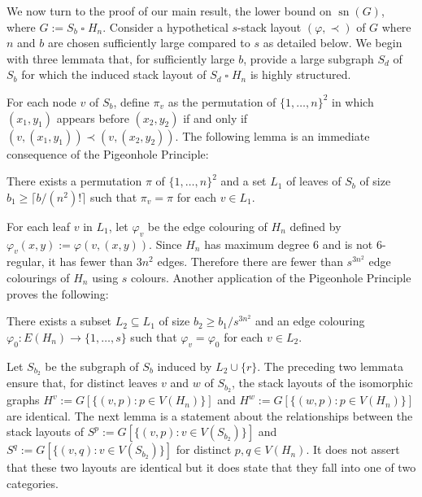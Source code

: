 \documentclass[kpfonts]{patmorin}
\DeclareMathOperator{\sn}{sn}
\renewcommand{\ge}{\geqslant}
\newcommand{\CartProd}{\mathbin{\square}}
\begin{document}
We now turn to the proof of our main result, the lower bound on $\sn(G)$, where $G:= S_b\CartProd H_n$. Consider a hypothetical $s$-stack layout $(\varphi,\prec)$ of $G$ where $n$ and $b$ are chosen sufficiently large compared to $s$ as detailed below. We begin with three lemmata that, for sufficiently large $b$, provide a large subgraph $S_d$ of $S_b$ for which the induced stack layout of $S_d\CartProd H_n$ is highly structured.

For each node $v$ of $S_b$, define $\pi_v$ as the permutation of $\{1,\ldots,n\}^2$ in which $(x_1,y_1)$ appears before $(x_2,y_2)$ if and only if $(v,(x_1,y_1))\prec (v,(x_2,y_2))$. The following lemma is an immediate consequence of the Pigeonhole Principle:

\begin{lem}
    There exists a permutation $\pi$ of $\{1,\ldots,n\}^2$ and a set $L_1$ of leaves of $S_b$ of size $b_1\ge \lceil b/(n^2)!\rceil$ such that $\pi_{v}=\pi$ for each $v\in L_1$.
\end{lem}


For each leaf $v$ in $L_1$, let $\varphi_v$ be the edge colouring of $H_n$ defined by $\varphi_v(x,y):=\varphi(v,(x,y))$. Since $H_n$ has maximum degree $6$ and is not 6-regular, it has fewer than $3n^2$ edges.  Therefore there are fewer than $s^{3n^2}$ edge colourings of $H_n$ using $s$ colours.  Another application of the Pigeonhole Principle proves the following:

\begin{lem}
    There exists a subset $L_2\subseteq L_1$ of size $b_2\ge b_1/s^{3n^2}$
    and an edge colouring $\varphi_0:E(H_n)\to\{1,\ldots,s\}$ such that $\varphi_v=\varphi_0$ for each $v\in L_2$.
\end{lem}


Let $S_{b_2}$ be the subgraph of $S_b$ induced by $L_2\cup\{r\}$. The preceding two lemmata ensure that, for distinct leaves $v$ and $w$ of $S_{b_2}$, the stack layouts of the isomorphic graphs $H^v:=G[\{(v,p):p\in V(H_n)\}]$ and $H^w:=G[\{(w,p):p\in V(H_n)\}]$ are identical.  The next lemma is a statement about the relationships between the stack layouts of $S^p:=G[\{(v,p):v\in V(S_{b_2})\}]$ and $S^q:=G[\{(v,q):v\in V(S_{b_2})\}]$ for  distinct $p,q\in V(H_n)$. 
 It does not assert that these two layouts are identical but it does state that they fall into one of two categories.
\end{document}
